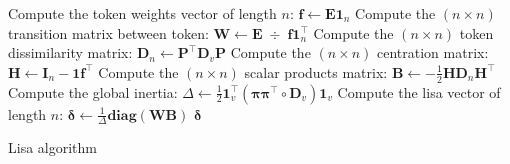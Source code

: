 \documentclass[11p]{article}
\begin{document}
\begin{algorithm}[H]
	\SetAlgoLined
	
	Compute the token weights vector of length $n$: $\mathbf{f} \leftarrow \mathbf{E} \mathbf{1}_n$\;
	Compute the $(n \times n)$ transition matrix between token: $\mathbf{W} \leftarrow \mathbf{E} \; \div \; \mathbf{f}\mathbf{1}_n^\top $\;
	Compute the $(n \times n)$ token dissimilarity matrix: $\mathbf{D}_n \leftarrow \mathbf{P}^\top \mathbf{D}_v \mathbf{P}$\;
	Compute the $(n \times n)$ centration matrix: $\mathbf{H} \leftarrow \mathbf{I}_n - \mathbf{1} \mathbf{f}^\top$\;
	Compute the $(n \times n)$ scalar products matrix: $\mathbf{B} \leftarrow - \frac{1}{2} \mathbf{H}\mathbf{D}_n \mathbf{H}^\top$\;
	Compute the global inertia:  $\Delta \leftarrow \frac{1}{2} \mathbf{1}_v^\top(\bm{\pi}\bm{\pi}^\top \circ \mathbf{D}_v)\mathbf{1}_v$\;
	Compute the lisa vector of length $n$: $\bm{\delta} \leftarrow \frac{1}{\Delta} \mathbf{diag} (\mathbf{W}\mathbf{B})$\;
	\Return $\bm{\delta}$\;
	\caption{Lisa algorithm}
\end{algorithm}

\end{document}
